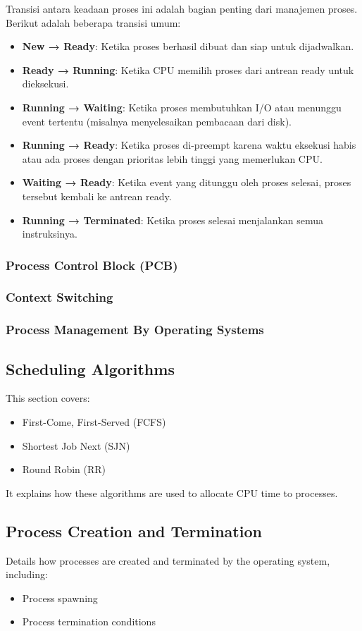 \documentclass[12pt]{article}
\begin{document}
Transisi antara keadaan proses ini adalah bagian penting dari manajemen proses. Berikut adalah beberapa transisi umum:
\begin{itemize}
    \item \textbf{New → Ready}: Ketika proses berhasil dibuat dan siap untuk dijadwalkan.
    \item \textbf{Ready → Running}: Ketika CPU memilih proses dari antrean ready untuk dieksekusi.
    \item \textbf{Running → Waiting}: Ketika proses membutuhkan I/O atau menunggu event tertentu (misalnya menyelesaikan pembacaan dari disk).
    \item \textbf{Running → Ready}: Ketika proses di-preempt karena waktu eksekusi habis atau ada proses dengan prioritas lebih tinggi yang memerlukan CPU.
    \item \textbf{Waiting → Ready}: Ketika event yang ditunggu oleh proses selesai, proses tersebut kembali ke antrean ready.
    \item \textbf{Running → Terminated}: Ketika proses selesai menjalankan semua instruksinya.
\end{itemize}

\subsubsection{Process Control Block (PCB)}
\subsubsection{Context Switching}
\subsubsection{Process Management By Operating Systems}

\subsection{Scheduling Algorithms}
This section covers:
\begin{itemize}
    \item First-Come, First-Served (FCFS)
    \item Shortest Job Next (SJN)
    \item Round Robin (RR)
\end{itemize}
It explains how these algorithms are used to allocate CPU time to processes.

\subsection{Process Creation and Termination}
Details how processes are created and terminated by the operating system, including:
\begin{itemize}
    \item Process spawning
    \item Process termination conditions
\end{itemize}
\end{document}

